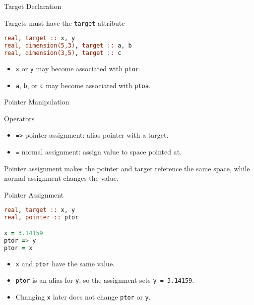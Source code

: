 \begin{frame}[fragile]{Target Declaration}

  \begin{block}{Targets must have the \texttt{target} attribute}
\begin{lstlisting}[language=Fortran]
real, target :: x, y
real, dimension(5,3), target :: a, b
real, dimension(3,5), target :: c
\end{lstlisting}
    \begin{itemize}
      \item \texttt{x} or \texttt{y} may become associated with \texttt{ptor}.
      \item \texttt{a}, \texttt{b}, or \texttt{c} may become associated with \texttt{ptoa}.
    \end{itemize}
  \end{block}
\end{frame}

\begin{frame}{Pointer Manipulation}
  \begin{block}{Operators}
    \begin{itemize}
      \item \texttt{=>} pointer assignment: alias pointer with a target.
      \item \texttt{=} normal assignment: assign value to space pointed at.
    \end{itemize}
    Pointer assignment makes the pointer and target reference the same space, while normal assignment changes the value.
  \end{block}
\end{frame}

\begin{frame}[fragile]{Pointer Assignment}
\begin{lstlisting}[language=Fortran]
real, target :: x, y
real, pointer :: ptor

x = 3.14159
ptor => y
ptor = x
\end{lstlisting}
  \begin{itemize}
    \item \texttt{x} and \texttt{ptor} have the same value.
    \item \texttt{ptor} is an alias for \texttt{y}, so the assignment sets \texttt{y = 3.14159}.
    \item Changing \texttt{x} later does not change \texttt{ptor} or \texttt{y}.
  \end{itemize}
\end{frame}

